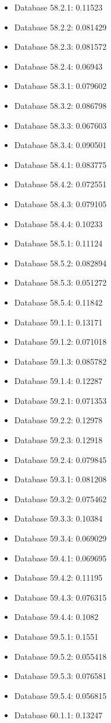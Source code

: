 \begin{itemize}
\item Database 58.2.1: 0.11523
\item Database 58.2.2: 0.081429
\item Database 58.2.3: 0.081572
\item Database 58.2.4: 0.06943
\item Database 58.3.1: 0.079602
\item Database 58.3.2: 0.086798
\item Database 58.3.3: 0.067603
\item Database 58.3.4: 0.090501
\item Database 58.4.1: 0.083775
\item Database 58.4.2: 0.072551
\item Database 58.4.3: 0.079105
\item Database 58.4.4: 0.10233
\item Database 58.5.1: 0.11124
\item Database 58.5.2: 0.082894
\item Database 58.5.3: 0.051272
\item Database 58.5.4: 0.11842
\item Database 59.1.1: 0.13171
\item Database 59.1.2: 0.071018
\item Database 59.1.3: 0.085782
\item Database 59.1.4: 0.12287
\item Database 59.2.1: 0.071353
\item Database 59.2.2: 0.12978
\item Database 59.2.3: 0.12918
\item Database 59.2.4: 0.079845
\item Database 59.3.1: 0.081208
\item Database 59.3.2: 0.075462
\item Database 59.3.3: 0.10384
\item Database 59.3.4: 0.069029
\item Database 59.4.1: 0.069695
\item Database 59.4.2: 0.11195
\item Database 59.4.3: 0.076315
\item Database 59.4.4: 0.1082
\item Database 59.5.1: 0.1551
\item Database 59.5.2: 0.055418
\item Database 59.5.3: 0.076581
\item Database 59.5.4: 0.056815
\item Database 60.1.1: 0.13247

\end{itemize}
